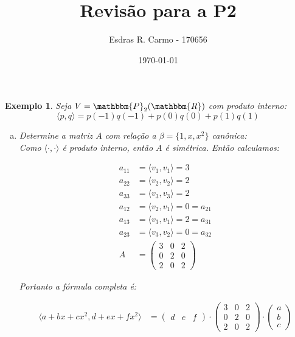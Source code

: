 \documentclass{article}
\author{Esdras R. Carmo - 170656}
\title{Revisão para a P2}
\date{\today}
\newcommand{\REAL} {\mathbbm{R}}
\newcommand{\POL}[1] {\mathbbm{P}_{#1} (\REAL)}
\newcommand{\interno}[2] {\langle #1 , #2\rangle}
\newtheorem{example}{Exemplo}[section]
\begin{document}
    \maketitle

    \begin{example}
        Seja $V = \POL{2}$ com produto interno:
        \[
            \interno{p}{q} = p(-1) q(-1) + p(0) q(0) + p(1) q(1)
        \]

        \begin{enumerate}[(a)]
            \item 
                Determine a matriz $A$ com relação a $\beta = \{1, x, x^2\}$ canônica:\\
                Como $\interno{\cdot}{\cdot}$ é produto interno, então $A$ é simétrica. Então calculamos:

                \begin{align*}
                    a_{11} &= \interno{v_1}{v_1} = 3\\
                    a_{22} &= \interno{v_2}{v_2} = 2\\
                    a_{33} &= \interno{v_3}{v_3} = 2\\
                    a_{12} &= \interno{v_2}{v_1} = 0 = a_{21}\\
                    a_{13} &= \interno{v_3}{v_1} = 2 = a_{31}\\
                    a_{23} &= \interno{v_3}{v_2} = 0 = a_{32}\\
                    A &= \begin{pmatrix}
                         3 & 0 & 2\\
                         0 & 2 & 0\\
                         2 & 0 & 2
                         \end{pmatrix}
                \end{align*}

                Portanto a fórmula completa é:

                \begin{align*}
                    \interno{a + bx + cx^2}{d + ex + fx^2} &= \begin{pmatrix}d&e&f\end{pmatrix} \cdot
                                                              \begin{pmatrix}
                                                                  3 & 0 & 2\\
                                                                  0 & 2 & 0\\
                                                                  2 & 0 & 2
                                                              \end{pmatrix} \cdot
                                                              \begin{pmatrix}a\\b\\c\end{pmatrix}
                \end{align*}


\end{enumerate}
\end{example}
\end{document}
